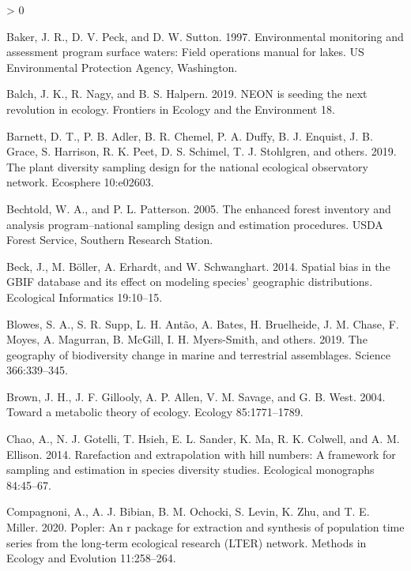 \documentclass[
  12pt,
]{article}
\newlength{\cslhangindent}
\newenvironment{CSLReferences}[2] %
 {%
  \setlength{\parindent}{0pt}
  \ifodd #1 \everypar{\setlength{\hangindent}{\cslhangindent}}\ignorespaces\fi
  \ifnum #2 > 0
  \setlength{\parskip}{#2\baselineskip}
  \fi
 }%
 {}
\begin{document}
\hypertarget{refs}{}
\begin{CSLReferences}{1}{0}
\leavevmode\hypertarget{ref-baker1997environmental}{}%
Baker, J. R., D. V. Peck, and D. W. Sutton. 1997. Environmental monitoring and assessment program surface waters: Field operations manual for lakes. US Environmental Protection Agency, Washington.

\leavevmode\hypertarget{ref-balch2019neon}{}%
Balch, J. K., R. Nagy, and B. S. Halpern. 2019. NEON is seeding the next revolution in ecology. Frontiers in Ecology and the Environment 18.

\leavevmode\hypertarget{ref-barnett2019plant}{}%
Barnett, D. T., P. B. Adler, B. R. Chemel, P. A. Duffy, B. J. Enquist, J. B. Grace, S. Harrison, R. K. Peet, D. S. Schimel, T. J. Stohlgren, and others. 2019. The plant diversity sampling design for the national ecological observatory network. Ecosphere 10:e02603.

\leavevmode\hypertarget{ref-bechtold2005enhanced}{}%
Bechtold, W. A., and P. L. Patterson. 2005. The enhanced forest inventory and analysis program--national sampling design and estimation procedures. USDA Forest Service, Southern Research Station.

\leavevmode\hypertarget{ref-beck2014spatial}{}%
Beck, J., M. Böller, A. Erhardt, and W. Schwanghart. 2014. Spatial bias in the GBIF database and its effect on modeling species' geographic distributions. Ecological Informatics 19:10--15.

\leavevmode\hypertarget{ref-blowes2019geography}{}%
Blowes, S. A., S. R. Supp, L. H. Antão, A. Bates, H. Bruelheide, J. M. Chase, F. Moyes, A. Magurran, B. McGill, I. H. Myers-Smith, and others. 2019. The geography of biodiversity change in marine and terrestrial assemblages. Science 366:339--345.

\leavevmode\hypertarget{ref-brown2004toward}{}%
Brown, J. H., J. F. Gillooly, A. P. Allen, V. M. Savage, and G. B. West. 2004. Toward a metabolic theory of ecology. Ecology 85:1771--1789.

\leavevmode\hypertarget{ref-chao2014rarefaction}{}%
Chao, A., N. J. Gotelli, T. Hsieh, E. L. Sander, K. Ma, R. K. Colwell, and A. M. Ellison. 2014. Rarefaction and extrapolation with hill numbers: A framework for sampling and estimation in species diversity studies. Ecological monographs 84:45--67.

\leavevmode\hypertarget{ref-compagnoni2020popler}{}%
Compagnoni, A., A. J. Bibian, B. M. Ochocki, S. Levin, K. Zhu, and T. E. Miller. 2020. Popler: An r package for extraction and synthesis of population time series from the long-term ecological research (LTER) network. Methods in Ecology and Evolution 11:258--264.


\end{CSLReferences}
\end{document}
